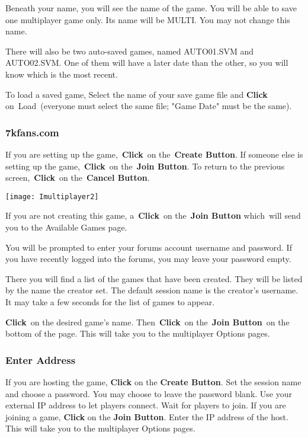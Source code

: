 Beneath your name, you will see the name of the game. You will be able to save one multiplayer game only. Its name will be MULTI. You may not change this name.

There will also be two auto-saved games, named AUTO01.SVM and AUTO02.SVM. One of them will have a later date than the other, so you will know which is the most recent.

To load a saved game, Select the name of your save game file and \textbf{Click} on Load (everyone must select the same file; "Game Date" must be the same).

\subsubsection{7kfans.com}

If you are setting up the game, \textbf{Click} on the \textbf{Create Button}. If someone else is setting up the game, \textbf{Click} on the \textbf{Join Button}. To return to the previous screen, \textbf{Click} on the \textbf{Cancel Button}.

\begin{center}
	\texttt{[image: Imultiplayer2]}
\end{center}

If you are not creating this game, a \textbf{Click} on the \textbf{Join Button} which will send you to the Available Games page.

You will be prompted to enter your forums account username and password. If you have recently logged into the forums, you may leave your password empty.

There you will find a list of the games that have been created. They will be listed by the name the creator set. The default session name is the creator’s username. It may take a few seconds for the list of games to appear.

\textbf{Click} on the desired game’s name. Then \textbf{Click} on the \textbf{Join Button} on the bottom of the page. This will take you to the multiplayer Options pages.

\subsubsection{Enter Address}

If you are hosting the game, \textbf{Click} on the \textbf{Create Button}. Set the session name and choose a password. You may choose to leave the password blank. Use your external IP address to let players connect. Wait for players to join. If you are joining a game, \textbf{Click} on the \textbf{Join Button}. Enter the IP address of the host. This will take you to the multiplayer Options pages.

